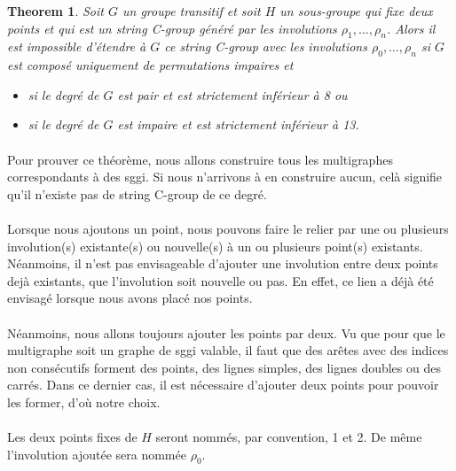 \documentclass[a4paper]{article}
\theoremstyle{mytheorem}
\newtheorem{theorem}[definition]{Theorem}
\begin{document}
\begin{theorem}
  Soit $G$ un groupe transitif et soit $H$ un sous-groupe qui fixe deux points et qui est un string C-group généré par les involutions $\rho_1, \dots, \rho_n$. Alors il est impossible d'étendre à $G$ ce string C-group avec les involutions $\rho_0, \dots, \rho_n$ si $G$ est composé uniquement de permutations impaires et
  \begin{itemize}
    \item si le degré de $G$ est pair et est strictement inférieur à 8 ou
    \item si le degré de $G$ est impaire et est strictement inférieur à 13.
  \end{itemize}
\end{theorem}

\paragraph{}
Pour prouver ce théorème, nous allons construire tous les multigraphes correspondants à des sggi. Si nous n'arrivons à en construire aucun, celà signifie qu'il n'existe pas de string C-group de ce degré.

\paragraph{}
Lorsque nous ajoutons un point, nous pouvons faire le relier par une ou plusieurs involution(s) existante(s) ou nouvelle(s) à un ou plusieurs point(s) existants.
Néanmoins, il n'est pas envisageable d'ajouter une involution entre deux points dejà existants, que l'involution soit nouvelle ou pas. En effet, ce lien a déjà été envisagé lorsque nous avons placé nos points.

\paragraph{}
Néanmoins, nous allons toujours ajouter les points par deux. Vu que pour que le multigraphe soit un graphe de sggi valable, il faut que des arêtes avec des indices non consécutifs forment des points, des lignes simples, des lignes doubles ou des carrés. Dans ce dernier cas, il est nécessaire d'ajouter deux points pour pouvoir les former, d'où notre choix.

\paragraph{}
Les deux points fixes de $H$ seront nommés, par convention, 1 et 2. De même l'involution ajoutée sera nommée $\rho_0$.
\end{document}
